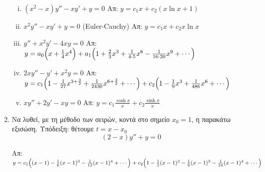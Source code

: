 \begin{enumerate}
\begin{enumerate}[i)]
      \item $ (x^{2}-x)y'' -xy'+y=0 $ %
        \hfill Απ:  $ y= c_{1}x + c_{2}(x \ln{x} + 1) $

      \item $ x^{2}y''-xy'+y=0 $ \quad (Euler-Cauchy) %
        \hfill Απ: $ y= c_{1}x + c_{2}x \ln{x} $ 

      \item $y''+x^2y'-4xy=0$
        \hfill Απ:
        $y= a_{0}\Bigl(x+\frac{1}{4}x^4\Bigr) + a_{1}\Bigl(1+\frac{2}{3}x^3+\frac{1}
        {4\cdot 5}x^6- \frac{1}{16\cdot 20}x^9+\cdots\Bigr) $

      \item $2xy''-y'+x^{2}y=0 $
        \hfill Απ:  $ y= c_{1}\Bigl(1- \frac{1}{27} x^{3+ \frac{3}{2}} + 
        \frac{1}{2430} x^{6+ \frac{3}{2} } + \cdots\Bigr) + 
        c_{2}\Bigl(1 - \frac{1}{9} x^{3} + \frac{1}{486} x^{6} + \cdots \Bigr) $

      \item $xy''+2y'-xy=0$
        \hfill Απ: 
        $y= c_{1}\frac{\cosh x}{x} + c_{2}\frac{\sinh x}{x}$
    \end{enumerate}

  \item Να λυθεί, με τη μέθοδο των σειρών, κοντά στο σημείο $ x_{0}=1 $, η παρακάτω
    εξισώση. \textcolor{Col1}{Υπόδειξη}: θέτουμε $ t=x- x_{0} $
    \[ 
      (2-x)y'' + y=0 
    \]

    \hfill Απ: $ y= c_{1}\Bigl((x-1)- \frac{1}{6} (x-1)^{3}- \frac{1}{12} (x-1)^{4} 
      + \cdots\Bigr) + c_{2}\Bigl(1- \frac{1}{2} (x-1)^{2} - \frac{1}{6} (x-1)^{3} 
    - \frac{1}{24} (x-1)^{4} + \cdots \Bigr) $  
\end{enumerate}





